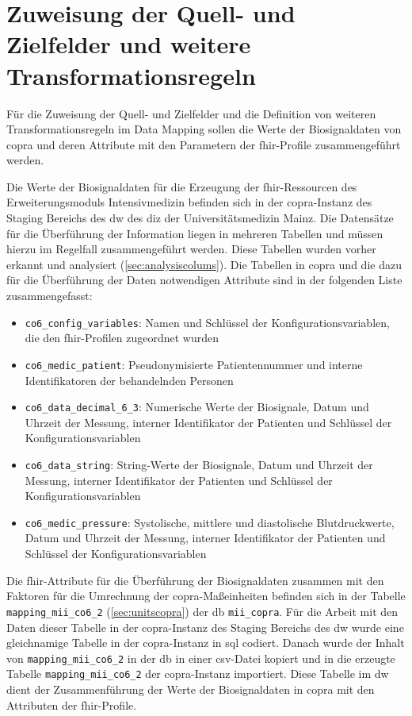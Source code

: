 \section{Zuweisung der Quell- und Zielfelder und weitere Transformationsregeln} \label{sec:transfer}

Für die Zuweisung der Quell- und Zielfelder und die Definition von weiteren Transformationsregeln im Data Mapping sollen die Werte der Biosignaldaten von \ac{copra} und deren Attribute mit den Parametern der \ac{fhir}-Profile zusammengeführt werden.

Die Werte der Biosignaldaten für die Erzeugung der \ac{fhir}-Ressourcen des Erweiterungsmoduls \glqq Intensivmedizin\grqq{} befinden sich in der \ac{copra}-Instanz des Staging Bereichs des \ac{dw} des \ac{diz} der Universitätsmedizin Mainz. Die Datensätze für die Überführung der Information liegen in mehreren Tabellen und müssen hierzu im Regelfall zusammengeführt werden. Diese Tabellen wurden vorher erkannt und analysiert (\ref{sec:analysiscolums}). Die Tabellen in \ac{copra} und die dazu für die Überführung der Daten notwendigen Attribute sind in der folgenden Liste zusammengefasst:
\begin{itemize}
  \item \texttt{co6\_config\_variables}: Namen und Schlüssel der Konfigurationsvariablen, die den \ac{fhir}-Profilen zugeordnet wurden
  \item \texttt{co6\_medic\_patient}: Pseudonymisierte Patientennummer und interne Identifikatoren der behandelnden Personen
  \item \texttt{co6\_data\_decimal\_6\_3}: Numerische Werte der Biosignale, Datum und Uhrzeit der Messung, interner Identifikator der Patienten und Schlüssel der Konfigurationsvariablen
  \item \texttt{co6\_data\_string}: String-Werte der Biosignale, Datum und Uhrzeit der Messung, interner Identifikator der Patienten und Schlüssel der Konfigurationsvariablen
  \item \texttt{co6\_medic\_pressure}: Systolische, mittlere und diastolische Blutdruckwerte, Datum und Uhrzeit der Messung, interner Identifikator der Patienten und Schlüssel der Konfigurationsvariablen
\end{itemize}

Die \ac{fhir}-Attribute für die Überführung der Biosignaldaten zusammen mit den Faktoren für die Umrechnung der \ac{copra}-Maßeinheiten befinden sich in der Tabelle \texttt{mapping\_mii\_co6\_2} (\ref{sec:unitscopra}) der \ac{db} \texttt{mii\_copra}. Für die Arbeit mit den Daten dieser Tabelle in der \ac{copra}-Instanz des Staging Bereichs des \ac{dw} wurde eine gleichnamige Tabelle in der \ac{copra}-Instanz in \ac{sql} codiert. Danach wurde der Inhalt von \texttt{mapping\_mii\_co6\_2} in der \ac{db} in einer \ac{csv}-Datei kopiert und in die erzeugte Tabelle \texttt{mapping\_mii\_co6\_2} der \ac{copra}-Instanz importiert. Diese Tabelle im \ac{dw} dient der Zusammenführung der Werte der Biosignaldaten in \ac{copra} mit den Attributen der \ac{fhir}-Profile.

